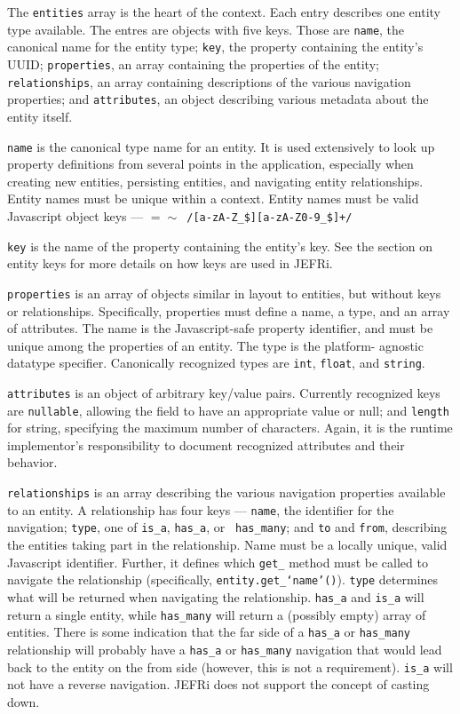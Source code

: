 \documentclass{article}
\newcommand{\ilcode}{\tt}
\begin{document}
The {\ilcode entities} array is the heart of the context. Each entry describes
one entity type available. The entres are objects with five keys. Those are
{\ilcode name}, the canonical name for the entity type; {\ilcode key}, the
property containing the
entity's UUID; {\ilcode properties}, an array containing the properties of the
entity; {\ilcode relationships}, an array containing descriptions of the various
navigation properties; and {\ilcode attributes}, an object describing various
metadata about the entity itself.

{\ilcode name} is the canonical type name for an entity. It is used extensively to
look up property definitions from several points in the application, especially
when creating new entities, persisting entities, and navigating entity
relationships. Entity names must be unique within a context. Entity names must
be valid Javascript object keys ---
{\ilcode $=\sim$ /[a-zA-Z\_\$][a-zA-Z0-9\_\$]+/}

{\ilcode key} is the name of the property containing the entity's key. See the
section on entity keys for more details on how keys are used in JEFRi.

{\ilcode properties} is an array of objects similar in layout to entities, but without
keys or relationships. Specifically, properties must define a name, a type, and
an array of attributes. The name is the Javascript-safe property identifier, and
must be unique among the properties of an entity. The type is the platform-
agnostic datatype specifier. Canonically recognized types are {\ilcode int},
{\ilcode float}, and {\ilcode string}.

{\ilcode attributes} is an object of arbitrary key/value pairs. Currently
recognized keys are {\ilcode nullable}, allowing the field to have an appropriate
value or null; and {\ilcode length} for string, specifying the maximum number of
characters. Again, it is the runtime implementor's responsibility to document
recognized attributes and their behavior.

{\ilcode relationships} is an array describing the various navigation properties available
to an entity. A relationship has four keys --- {\ilcode name}, the identifier for the
navigation; {\ilcode type}, one of {\ilcode is\_a}, {\ilcode has\_a}, or {\ilcode
has\_many}; and {\ilcode to} and {\ilcode from}, describing the entities taking part in the
relationship. Name must be a locally unique, valid Javascript identifier.
Further, it defines which {\ilcode get\_} method must be called to navigate the
relationship (specifically, {\ilcode entity.get\_`name'()}). {\ilcode type} determines
what will be returned when navigating the relationship. {\ilcode has\_a} and
{\ilcode is\_a} will return a single entity, while {\ilcode has\_many} will
return a (possibly empty) array of entities. There is some indication that
the far side of a {\ilcode has\_a} or {\ilcode has\_many} relationship will
probably have a {\ilcode has\_a} or {\ilcode has\_many} navigation that would
lead back to the entity on the from side (however, this is not a requirement).
{\ilcode is\_a} will not have a reverse navigation. JEFRi does not support the
concept of casting down.
\end{document}
